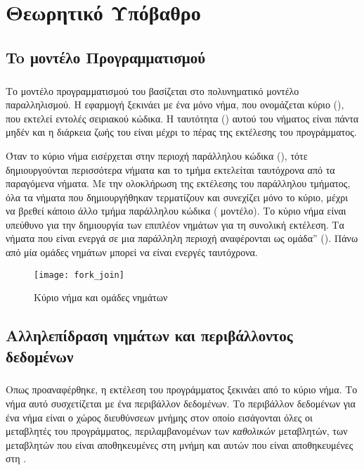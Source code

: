 \section{Θεωρητικό Υπόβαθρο}
\subsection{To μοντέλο Προγραμματισμού }
\subparagraph{}
Το μοντέλο προγραμματισμού του \emph{} βασίζεται στο πολυνηματικό μοντέλο παραλληλισμού.
Η εφαρμογή ξεκινάει με ένα μόνο νήμα, που ονομάζεται κύριο (\emph{}), που εκτελεί
εντολές σειριακού κώδικα. H ταυτότητα (\emph{}) αυτού του νήματος είναι πάντα μηδέν και η
διάρκεια ζωής του είναι μέχρι το πέρας της εκτέλεσης του προγράμματος\cite{pdplab}. 

Όταν το κύριο νήμα  εισέρχεται στην περιοχή παράλληλου κώδικα (), τότε
δημιουργούνται περισσότερα νήματα και το τμήμα εκτελείται ταυτόχρονα από τα παραγόμενα νήματα.
Με την ολοκλήρωση της εκτέλεσης του παράλληλου τμήματος, όλα τα νήματα που δημιουργήθηκαν
τερματίζουν και συνεχίζει μόνο το κύριο, μέχρι να βρεθεί κάποιο άλλο τμήμα παράλληλου κώδικα
( μοντέλο)\cite{pdplab}. Το κύριο νήμα είναι υπεύθυνο για την δημιουργία των επιπλέον
νημάτων για τη συνολική εκτέλεση. Τα νήματα που είναι ενεργά σε μια παράλληλη περιοχή αναφέρονται ως
ομάδα” (\emph{}). Πάνω από μία ομάδες νημάτων μπορεί να είναι ενεργές
ταυτόχρονα\cite{ompblaise}.

\begin{figure}[h]
\texttt{[image: fork\_join]}
\captionsetup{justification=centering, singlelinecheck=false}
\caption{Κύριο νήμα και ομάδες νημάτων}
\label{fig:fork_join}
\end{figure}

\subsection{Αλληλεπίδραση νημάτων και περιβάλλοντος δεδομένων}
\subparagraph{}
Οπως προαναφέρθηκε, η εκτέλεση του προγράμματος ξεκινάει από το κύριο νήμα. Το νήμα αυτό
συσχετίζεται με ένα περιβάλλον δεδομένων. Το περιβάλλον δεδομένων για ένα νήμα είναι ο χώρος
διευθύνσεων μνήμης στον οποίο εισάγονται όλες οι μεταβλητές του προγράμματος, περιλαμβανομένων των
\emph{καθολικών} μεταβλητών, των μεταβλητών που είναι αποθηκευμένες στη μνήμη \emph{} και
αυτών που είναι αποθηκευμένες στη \emph{}\cite{book2}. 

